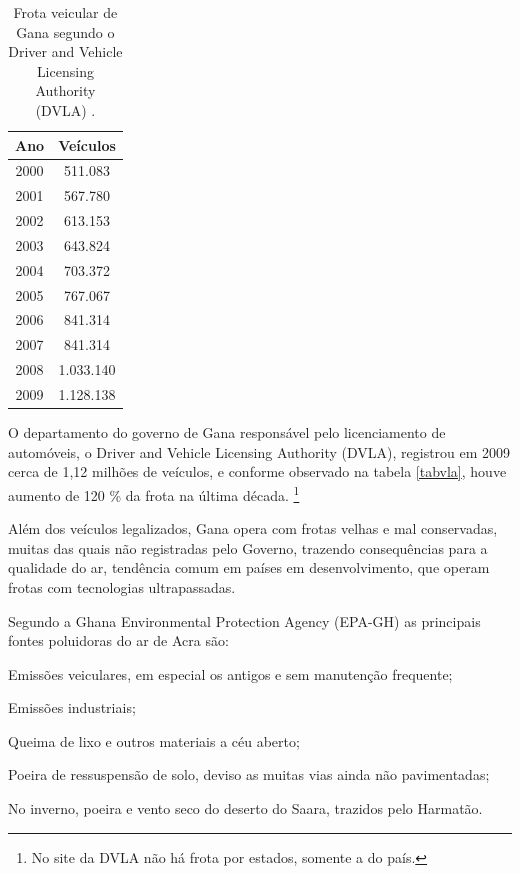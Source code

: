 \begin{table}
 \centering
  \begin{tabular}{cc}
  \hline
  Ano & Veículos \\ 
  \hline
  2000 & 511.083 \\ 
  2001 & 567.780 \\ 
  2002 & 613.153 \\ 
  2003 & 643.824 \\ 
  2004 & 703.372 \\ 
  2005 & 767.067 \\ 
  2006 & 841.314 \\ 
  2007 & 841.314 \\ 
  2008 & 1.033.140 \\ 
  2009 & 1.128.138 \\ 
  \hline
  \end{tabular}
  \caption{Frota veicular de Gana segundo o Driver and Vehicle Licensing 
           Authority (DVLA) \citeyearpar{dvla}. \label{table:dvla}}
\end{table}

O departamento do governo de Gana responsável pelo licenciamento de automóveis, 
o Driver and Vehicle Licensing Authority (DVLA), registrou em 2009 cerca de 1,12
milhões de veículos, e conforme observado na tabela \ref{tabvla}, houve 
aumento de 120 \% da frota na última década. \footnote{No site da DVLA não há 
frota por estados, somente a do país.}

Além dos veículos legalizados, Gana opera com frotas velhas e 
mal conservadas, muitas das quais não registradas pelo Governo, trazendo 
consequências para a qualidade do ar, tendência comum em países em desenvolvimento, 
que operam frotas com tecnologias ultrapassadas. 

Segundo a Ghana Environmental Protection Agency (EPA-GH) \citeyearpar{epa2015} 
as principais fontes poluidoras do ar de Acra são:

\begin{itemize}
\begin{spacing}{1.0}
  \item Emissões veiculares, em especial os antigos e sem manutenção
        frequente;
  \item Emissões industriais;
  \item Queima de lixo e outros materiais a céu aberto;
  \item Poeira de ressuspensão de solo, deviso as muitas vias ainda não 
        pavimentadas;
  \item No inverno, poeira e vento seco do deserto do Saara, trazidos 
        pelo Harmatão.
\end{spacing}
\end{itemize}

